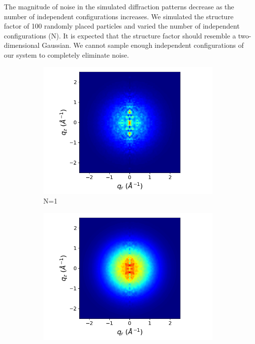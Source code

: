 \documentclass[journal=jpcbfk,manusciprt=article]{achemso}
\begin{document}
  The magnitude of noise in the simulated diffraction patterns decrease as 
  the number of independent configurations increases. We simulated the structure
  factor of 100 randomly placed particles and varied the number of independent 
  configurations (N). It is expected that the structure factor should resemble
  a two-dimensional Gaussian. We cannot sample enough independent configurations
  of our system to completely eliminate noise.
  
  \begin{figure}[!htb]
  \centering
  \begin{subfigure}{0.45\linewidth}
  \centering
  \includegraphics[width=\textwidth]{xrd_1frame.png}
  \caption{N=1}
  \end{subfigure}
  \begin{subfigure}{0.45\linewidth}
  \centering
  \includegraphics[width=\textwidth]{xrd_10frame.png}

\end{subfigure}
\end{figure}
\end{document}
